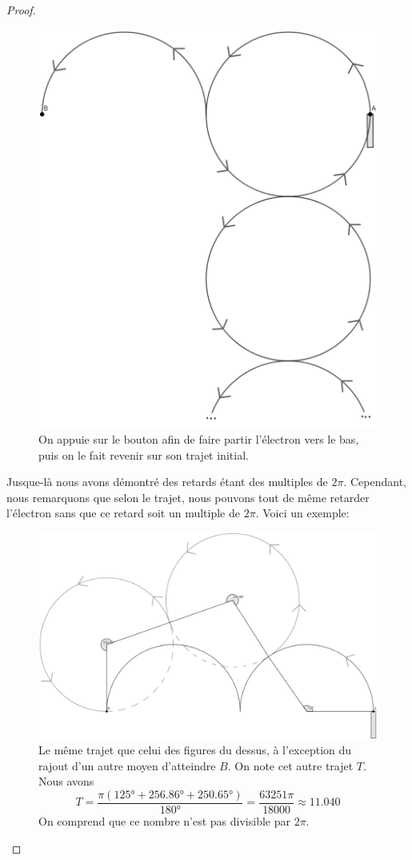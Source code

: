 \documentclass[a4paper]{amsart}
\theoremstyle{definition}
\theoremstyle{remark}
\numberwithin{equation}{section}
\begin{document}
\begin{proof}
  \begin{figure}[H]
    \centering
    \includegraphics[scale=0.2]{images/make_it_longer.png}
    \caption{On appuie sur le bouton afin de faire partir l'électron vers le bas, puis on le fait revenir sur son trajet initial.}
  \end{figure}

  Jusque-là nous avons démontré des retards étant des multiples de $2\pi$. Cependant, nous remarquons que selon le trajet, nous pouvons tout de même retarder l'électron sans que ce retard soit un multiple de $2\pi$. Voici un exemple:

  \begin{figure}[H]
    \centering
    \includegraphics[scale=0.205]{images/not_a_multiple_of_pi.png}
    \caption{Le même trajet que celui des figures du dessus, à l'exception du rajout d'un autre moyen d'atteindre $B$. On note cet autre trajet $T$. Nous avons \[T=\frac{\pi(125°+256.86°+250.65°)}{180°}=\frac{63251\pi}{18000}\approx 11.040\] 
    On comprend que ce nombre n'est pas divisible par $2\pi$.}
  \end{figure}


\end{proof}
\end{document}
